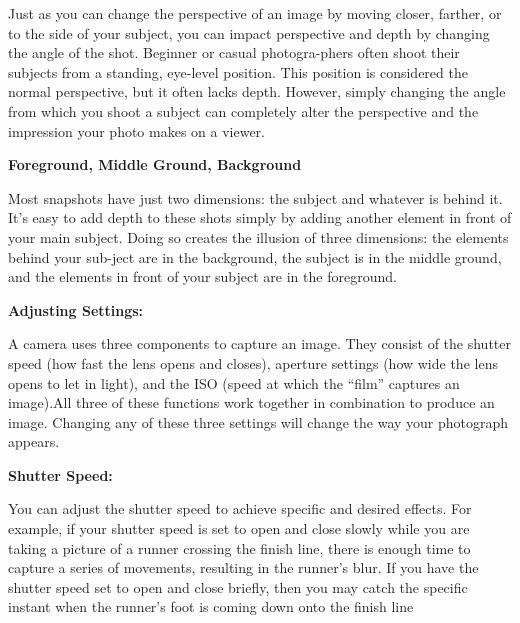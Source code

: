 \documentclass{report}
\begin{document}
    \bigbreak \noindent 
    Just as you can change the perspective of an image by moving closer, farther, or to the side of your subject, you can impact perspective and depth by changing the angle of the shot. Beginner or casual photogra-phers often shoot their subjects from a standing, eye-level position. This position is considered the normal perspective, but it often lacks depth. However, simply changing the angle from which you shoot a subject can completely alter the perspective and the impression your photo makes on a viewer.

    \pagebreak
    \begin{Large}
        \noindent \textbf{Foreground, Middle Ground, Background}
    \end{Large}

    \bigbreak \noindent 
    Most snapshots have just two dimensions: the subject and whatever is behind it. It’s easy to add depth to these shots simply by adding another element in front of your main subject. Doing so creates the illusion of three dimensions: the elements behind your sub-ject are in the background, the subject is in the middle ground, and the elements in front of your subject are in the foreground.

    \bigbreak \noindent \bigbreak \noindent 
    \begin{Large}
        \textbf{Adjusting Settings:}
    \end{Large}

    \bigbreak \noindent 
    A camera uses three components to capture an image. They consist of the shutter speed (how fast the lens opens and closes), aperture settings (how wide the lens opens to let in light), and the  ISO (speed at which the “film” captures an image).All three of these functions work together in combination to produce an image. Changing any of these three settings will change the way your photograph appears.

    \bigbreak \noindent 

    \bigbreak \noindent \bigbreak \noindent 
    \begin{Large}
        \textbf{Shutter Speed:}
    \end{Large}

    \bigbreak \noindent 
    You can adjust the shutter speed to achieve specific and desired effects. For example, if your shutter speed is set to open and close slowly while you are taking a picture of a runner crossing the finish line, there is enough time to capture a series of movements, resulting in the runner’s blur. If you have the shutter speed set to open and close briefly, then you may catch the specific instant when the runner’s foot is coming down onto the finish line
\end{document}
